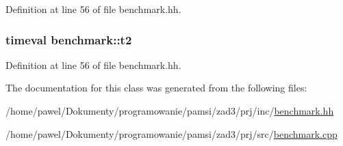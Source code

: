 Definition at line 56 of file benchmark.\-hh.

\hypertarget{classbenchmark_aea9f22e585c0c5826329e48a97a99803}{
\subsubsection[{t2}]{\setlength{\rightskip}{0pt plus 5cm}timeval benchmark\-::t2\hspace{0.3cm}{\ttfamily [private]}}}\label{classbenchmark_aea9f22e585c0c5826329e48a97a99803}


Definition at line 56 of file benchmark.\-hh.



The documentation for this class was generated from the following files\-:\begin{DoxyCompactItemize}
\item 
/home/pawel/\-Dokumenty/programowanie/pamsi/zad3/prj/inc/\hyperlink{benchmark_8hh}{benchmark.\-hh}\item 
/home/pawel/\-Dokumenty/programowanie/pamsi/zad3/prj/src/\hyperlink{benchmark_8cpp}{benchmark.\-cpp}\end{DoxyCompactItemize}
